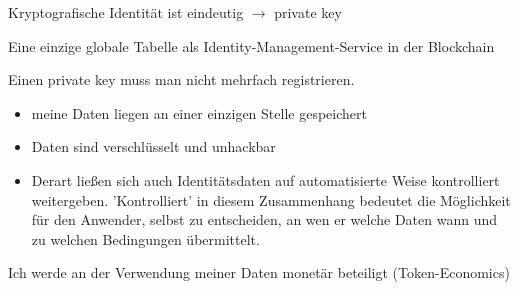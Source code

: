 \vspace{0.3cm}

\begin{Solution}

Kryptografische Identität ist eindeutig $\rightarrow$ private key

\end{Solution}

\vspace{0.3cm}


\begin{Solution}

Eine einzige globale Tabelle als Identity-Management-Service in der Blockchain

\end{Solution}

\vspace{0.3cm}


\begin{Solution}[mangelhafte UX]

Einen private key muss man nicht mehrfach registrieren.

\end{Solution}

\vspace{0.3cm}


\begin{Solution}[Datenschutz]

\begin{itemize}
  \item meine Daten liegen an einer einzigen Stelle gespeichert
  \item Daten sind verschlüsselt und unhackbar
  \item Derart ließen sich auch Identitätsdaten auf automatisierte Weise kontrolliert weitergeben. 'Kontrolliert' in diesem Zusammenhang bedeutet die Möglichkeit für den Anwender, selbst zu entscheiden, an wen er welche Daten wann und zu welchen Bedingungen übermittelt.
\end{itemize}

\end{Solution}

\vspace{0.3cm}


\begin{Solution}

Ich werde an der Verwendung meiner Daten monetär beteiligt (Token-Economics)

\end{Solution}

